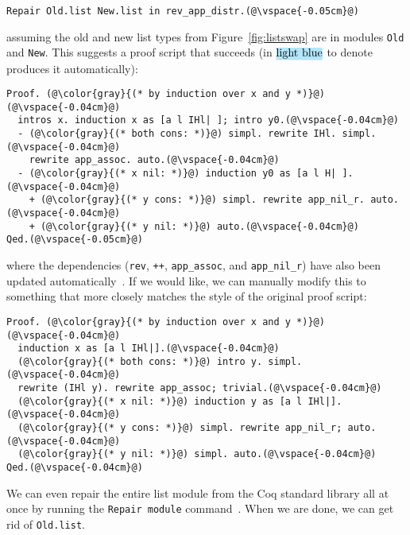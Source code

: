 \begin{lstlisting}
Repair Old.list New.list in rev_app_distr.(@\vspace{-0.05cm}@)
\end{lstlisting}
assuming the old and new list types from Figure~\ref{fig:listswap} are in modules \lstinline{Old} and \lstinline{New}.
This suggests a proof script that succeeds (in $\codeauto{light blue}$ to denote \toolname produces it automatically):

\begin{lstlisting}[backgroundcolor=\color{cyan!30}]
Proof. (@\color{gray}{(* by induction over x and y *)}@)(@\vspace{-0.04cm}@)
  intros x. induction x as [a l IHl| ]; intro y0.(@\vspace{-0.04cm}@)
  - (@\color{gray}{(* both cons: *)}@) simpl. rewrite IHl. simpl.(@\vspace{-0.04cm}@)
    rewrite app_assoc. auto.(@\vspace{-0.04cm}@)
  - (@\color{gray}{(* x nil: *)}@) induction y0 as [a l H| ].(@\vspace{-0.04cm}@)
    + (@\color{gray}{(* y cons: *)}@) simpl. rewrite app_nil_r. auto.(@\vspace{-0.04cm}@)
    + (@\color{gray}{(* y nil: *)}@) auto.(@\vspace{-0.04cm}@)
Qed.(@\vspace{-0.05cm}@)
\end{lstlisting}
where the dependencies (\lstinline{rev}, \lstinline{++}, \lstinline{app_assoc}, and \lstinline{app_nil_r}) have
also been updated automatically~\href{https://github.com/uwplse/pumpkin-pi/blob/silent/plugin/coq/Swap.v}{}. %
If we would like, we can manually modify this to something that more closely matches the style of the original proof script:

\begin{lstlisting}
Proof. (@\color{gray}{(* by induction over x and y *)}@)(@\vspace{-0.04cm}@)
  induction x as [a l IHl|].(@\vspace{-0.04cm}@)
  (@\color{gray}{(* both cons: *)}@) intro y. simpl.(@\vspace{-0.04cm}@)
  rewrite (IHl y). rewrite app_assoc; trivial.(@\vspace{-0.04cm}@)
  (@\color{gray}{(* x nil: *)}@) induction y as [a l IHl|].(@\vspace{-0.04cm}@)
  (@\color{gray}{(* y cons: *)}@) simpl. rewrite app_nil_r; auto.(@\vspace{-0.04cm}@)
  (@\color{gray}{(* y nil: *)}@) simpl. auto.(@\vspace{-0.04cm}@)
Qed.(@\vspace{-0.04cm}@)
\end{lstlisting}
We can even repair the entire list module from the Coq standard library all at once by running the \lstinline{Repair module}
command~\href{https://github.com/uwplse/pumpkin-pi/blob/silent/plugin/coq/Swap.v}{}. %
When we are done, we can get rid of \lstinline{Old.list}. %

